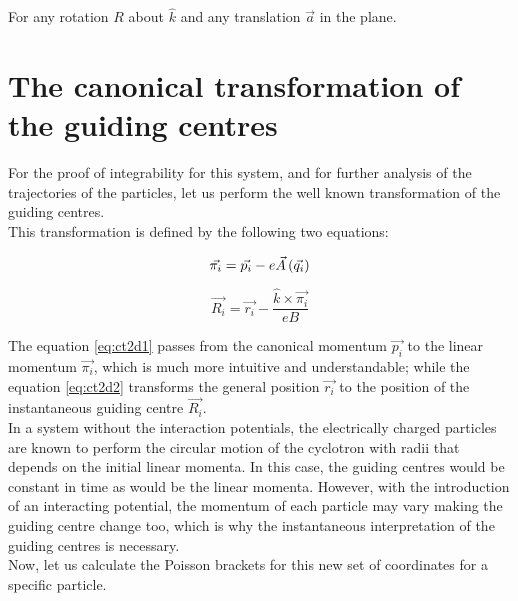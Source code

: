 For any rotation $R$ about $\hat{k}$ and any translation $\vec{a}$ in the plane.\\

\section{The canonical transformation of the guiding centres}

For the proof of integrability for this system, and for further analysis of the trajectories of the particles, let us perform the well known transformation of the guiding centres.\\

This transformation is defined by the following two equations:

\begin{equation}
\vec{\pi_i} = \vec{p_i} - e\vec{A}\left( \vec{q_i} \right)
\label{eq:ct2d1}
\end{equation}

\begin{equation}
\vec{R_i} = \vec{r_i} - \frac{\hat{k}\times\vec{\pi_i}}{eB}
\label{eq:ct2d2}
\end{equation}

The equation \eqref{eq:ct2d1} passes from the canonical momentum $\vec{p_i}$ to the linear momentum $\vec{\pi_i}$, which is much more intuitive and understandable; while the equation \eqref{eq:ct2d2} transforms the general position  $\vec{r_i}$ to the position of the instantaneous guiding centre $\vec{R_i}$.\\

In a system without the interaction potentials, the electrically charged particles are known to perform the circular motion of the cyclotron with radii that depends on the initial linear momenta. In this case, the guiding centres would be constant in time as would be the linear momenta. However, with the introduction of an interacting potential, the momentum of each particle may vary making the guiding centre change too, which is why the instantaneous interpretation of the guiding centres is necessary.\\

Now, let us calculate the Poisson brackets for this new set of coordinates for a specific particle.

